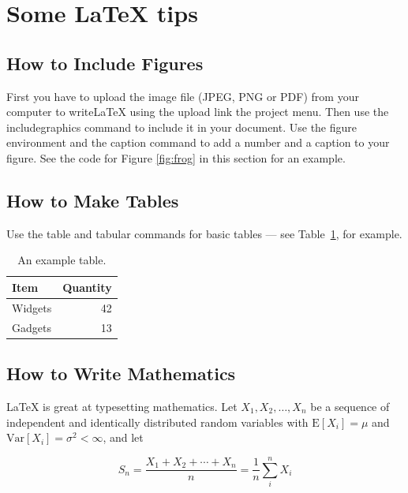 \documentclass[a4paper]{article}
\begin{document}
\newpage
\section{Some LaTeX tips}
\label{sec:latex}
\subsection{How to Include Figures}

First you have to upload the image file (JPEG, PNG or PDF) from your computer to writeLaTeX using the upload link the project menu. Then use the includegraphics command to include it in your document. Use the figure environment and the caption command to add a number and a caption to your figure. See the code for Figure \ref{fig:frog} in this section for an example.


\subsection{How to Make Tables}

Use the table and tabular commands for basic tables --- see Table~\ref{tab:widgets}, for example.

\begin{table}
\centering
\begin{tabular}{l|r}
Item & Quantity \\\hline
Widgets & 42 \\
Gadgets & 13
\end{tabular}
\caption{\label{tab:widgets}An example table.}
\end{table}

\subsection{How to Write Mathematics}

\LaTeX{} is great at typesetting mathematics. Let $X_1, X_2, \ldots, X_n$ be a sequence of independent and identically distributed random variables with $\text{E}[X_i] = \mu$ and $\text{Var}[X_i] = \sigma^2 < \infty$, and let

\begin{equation}
S_n = \frac{X_1 + X_2 + \cdots + X_n}{n}
      = \frac{1}{n}\sum_{i}^{n} X_i
\label{eq:sn}
\end{equation}
\end{document}
